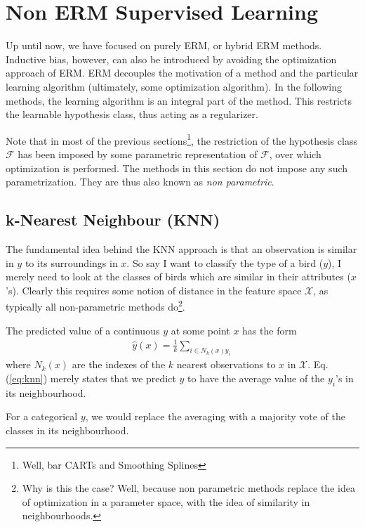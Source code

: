 \documentclass[12pt,a4paper]{article}
\theoremstyle{plain}
\theoremstyle{definition}
\newcommand{\hypclass}{\mathcal{F}}
\newcommand{\featureS}{\mathcal{X}}
\begin{document}
\section{Non ERM Supervised Learning}
\label{sec:non_erm}
Up until now, we have focused on purely ERM, or hybrid ERM methods.
Inductive bias, however, can also be introduced by avoiding the optimization approach of ERM.
ERM decouples the motivation of a method and the particular learning algorithm (ultimately, some optimization algorithm).
In the following methods, the learning algorithm is an integral part of the method. 
This restricts the learnable hypothesis class, thus acting as a regularizer.

Note that in most of the previous sections\footnote{Well, bar CARTs and Smoothing Splines}, the restriction of the hypothesis class $\hypclass$ has been imposed by some parametric representation of $\hypclass$, over which optimization is performed.
The methods in this section do not impose any such parametrization. They are thus also known as \emph{non parametric}.

 

\subsection{k-Nearest Neighbour (KNN)}
\label{sec:knn}
The fundamental idea behind the KNN approach is that an observation is similar in $y$ to its surroundings in $x$. 
So say I want to classify the type of a bird ($y$), I merely need to look at the classes of birds which are similar in their attributes ($x$'s). 
Clearly this requires some notion of distance in the feature space $\featureS$, as typically all non-parametric methods do\footnote{Why is this the case? Well, because non parametric methods replace the idea of optimization in a parameter space, with the idea of similarity in neighbourhoods.}.

The predicted value of a continuous $y$ at some point $x$ has the form
\begin{align}
\label{eq:knn}
	\hat{y}(x)=\frac{1}{k}\sum_{i \in N_k(x) y_i}
\end{align}
where $N_k(x)$ are the indexes of the $k$ nearest observations to $x$ in $\featureS$.
Eq.(\ref{eq:knn}) merely states that we predict $y$ to have the average value of the $y_i$'s in its neighbourhood.

For a categorical $y$, we would replace the averaging with a majority vote of the classes in its neighbourhood.
\end{document}
